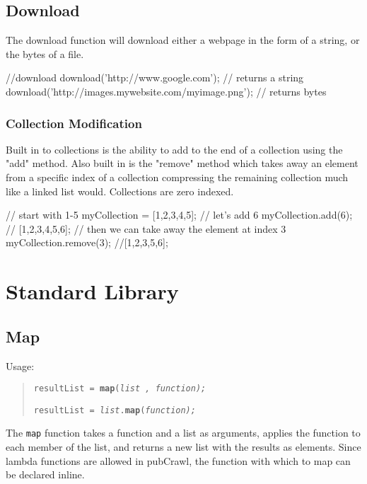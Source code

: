\documentclass[oneside]{book}
\begin{document}
\section{Download}
The download function will download either a webpage in the form of a string, or the bytes of a file.\\
\begin{mdframed}[hidealllines=true,backgroundcolor=gray!10,skipbelow=.5em,skipabove=.5em]
\begin{code}
//download
download('http://www.google.com'); // returns a string
download('http://images.mywebsite.com/myimage.png'); // returns bytes
\end{code}
\end{mdframed}

\subsection{Collection Modification}
Built in to collections is the ability to add to the end of a collection using the "add" method. Also built in is the "remove" method which takes away an element from a specific index of a collection compressing the remaining collection much like a linked list would. Collections are zero indexed.

\begin{mdframed}
[hidealllines=true,backgroundcolor=gray!10,skipbelow=.5em,skipabove=.5em]
\begin{code}
// start with 1-5
myCollection = [1,2,3,4,5];
// let's add 6
myCollection.add(6); // [1,2,3,4,5,6];
// then we can take away the element at index 3
myCollection.remove(3); //[1,2,3,5,6];
\end{code}
\end{mdframed}



\chapter{Standard Library}
\section{Map}

Usage:
\begin{quote}
\texttt{resultList = }\texttt{\textbf{map}}\texttt{(}\texttt{\emph{list
, function);}}

\texttt{resultList = }\texttt{\emph{list}}\texttt{.}\texttt{\textbf{map}}\texttt{(}\texttt{\emph{function);}}
\end{quote}
The \texttt{map} function takes a function and a list as arguments,
applies the function to each member of the list, and returns a new
list with the results as elements. Since lambda functions are allowed
in pubCrawl, the function with which to map can be declared inline. 
\end{document}
